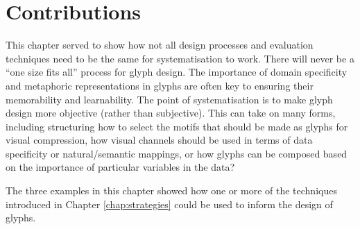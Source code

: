 %
%
%
\newpage

\newpage

\newpage

\newpage

\section{Contributions}

This chapter served to show how not all design processes and evaluation techniques need to be the same for systematisation to work.
There will never be a ``one size fits all'' process for glyph design.
The importance of domain specificity and metaphoric representations in glyphs are often key to ensuring their memorability and learnability.
The point of systematisation is to make glyph design more objective (rather than subjective).
This can take on many forms, including structuring how to select the motifs that should be made as glyphs for visual compression, how visual channels should be used in terms of data specificity or natural/semantic mappings, or how glyphs can be composed based on the importance of particular variables in the data?

The three examples in this chapter showed how one or more of the techniques introduced in Chapter \ref{chap:strategies} could be used to inform the design of glyphs.\\


